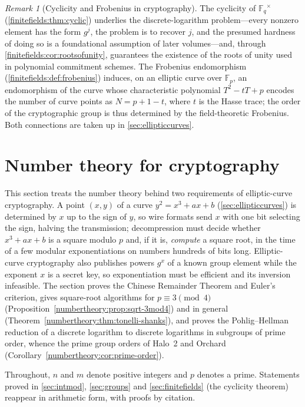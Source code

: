 \documentclass[11pt,a4paper]{article}
\theoremstyle{definition}
\theoremstyle{remark}
\newtheorem{remark}[theorem]{Remark}
\newcommand{\Fp}{\ensuremath{\mathbb{F}_{p}}}
\newcommand{\Fq}{\ensuremath{\mathbb{F}_{q}}}
\begin{document}
\begin{remark}[Cyclicity and Frobenius in cryptography]
\label{finitefields:rem:cryptosummary}
The cyclicity of \(\Fq^\times\)
(\cref{finitefields:thm:cyclic}) underlies the discrete-logarithm
problem---every nonzero element has the form \(g^j\), the problem is to
recover \(j\), and the presumed hardness of doing so is a foundational
assumption of later volumes---and, through
\cref{finitefields:cor:rootsofunity}, guarantees the existence of the
roots of unity used in polynomial commitment schemes. The Frobenius
endomorphism (\cref{finitefields:def:frobenius}) induces, on an
elliptic curve over \(\Fp\), an endomorphism of the curve whose
characteristic polynomial \(T^2 - tT + p\) encodes the number of curve
points as \(N = p + 1 - t\), where \(t\) is the Hasse trace; the order of
the cryptographic group is thus determined by the field-theoretic
Frobenius. Both connections are taken up in
\cref{sec:ellipticcurves}.
\end{remark}

\section{Number theory for cryptography}\label{sec:numbertheory}

This section treats the number theory behind two requirements of
elliptic-curve cryptography. A point \((x, y)\) of a curve
\(y^2 = x^3 + ax + b\) (\cref{sec:ellipticcurves}) is determined by
\(x\) up to the sign of \(y\), so wire formats send \(x\) with one bit
selecting the sign, halving the transmission; decompression must decide
whether \(x^3 + ax + b\) is a square modulo \(p\) and, if it is,
\emph{compute} a square root, in the time of a few modular
exponentiations on numbers hundreds of bits long. Elliptic-curve
cryptography also publishes powers \(g^x\) of a known group element
while the exponent \(x\) is a secret key, so exponentiation must be
efficient and its inversion infeasible. The section proves the Chinese
Remainder Theorem and Euler's criterion, gives square-root algorithms
for \(p \equiv 3 \pmod 4\)
(Proposition~\ref{numbertheory:prop:sqrt-3mod4}) and in general
(Theorem~\ref{numbertheory:thm:tonelli-shanks}), and proves the
Pohlig--Hellman reduction of a discrete logarithm to discrete logarithms
in subgroups of prime order, whence the prime group orders of Halo~2 and
Orchard (Corollary~\ref{numbertheory:cor:prime-order}).

Throughout, \(n\) and \(m\) denote positive integers and \(p\) denotes a
prime. Statements proved in \cref{sec:intmod}, \cref{sec:groups} and
\cref{sec:finitefields} (the cyclicity theorem) reappear in arithmetic
form, with proofs by citation.
\end{document}
